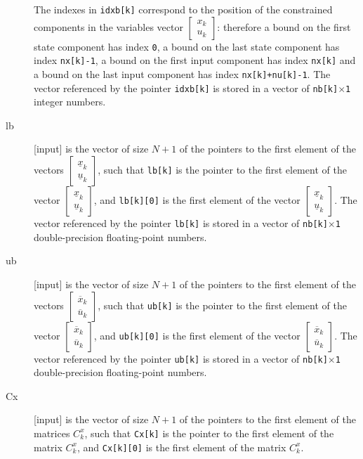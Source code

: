 \documentclass{report}
\begin{document}
\begin{description}
The indexes in {\tt idxb[k]} correspond to the position of the constrained components in the variables vector $\begin{bmatrix} x_k \\ u_k \end{bmatrix}$: therefore a bound on the first state component has index {\tt 0}, a bound on the last state component has index {\tt nx[k]-1}, a bound on the first input component has index {\tt nx[k]} and a bound on the last input component has index {\tt nx[k]+nu[k]-1}.
The vector referenced by the pointer {\tt idxb[k]} is stored in a vector of {\tt nb[k]$\times$1} integer numbers.
\item[lb] [input] is the vector of size $N+1$ of the pointers to the first element of the vectors $\begin{bmatrix} \underline x_k \\ \underline u_k \end{bmatrix}$, such that {\tt lb[k]} is the pointer to the first element of the vector $\begin{bmatrix} \underline x_k \\ \underline u_k \end{bmatrix}$, and {\tt lb[k][0]} is the first element of the vector $\begin{bmatrix} \underline x_k \\ \underline u_k \end{bmatrix}$.
The vector referenced by the pointer {\tt lb[k]} is stored in a vector of {\tt nb[k]$\times$1} double-precision floating-point numbers.
\item[ub] [input] is the vector of size $N+1$ of the pointers to the first element of the vectors $\begin{bmatrix} \overline x_k \\ \overline u_k \end{bmatrix}$, such that {\tt ub[k]} is the pointer to the first element of the vector $\begin{bmatrix} \overline x_k \\ \overline u_k \end{bmatrix}$, and {\tt ub[k][0]} is the first element of the vector $\begin{bmatrix} \overline x_k \\ \overline u_k \end{bmatrix}$.
The vector referenced by the pointer {\tt ub[k]} is stored in a vector of {\tt nb[k]$\times$1} double-precision floating-point numbers.
\item[Cx] [input] is the vector of size $N+1$ of the pointers to the first element of the matrices $C^x_k$, such that {\tt Cx[k]} is the pointer to the first element of the matrix $C^x_k$, and {\tt Cx[k][0]} is the first element of the matrix $C^x_k$.

\end{description}
\end{document}
